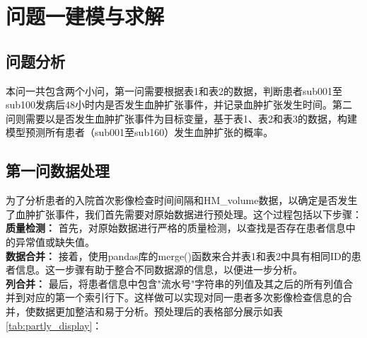 \documentclass[bwprint]{gmcmthesis}
\begin{document}
\clearpage
\section{问题一建模与求解}
\subsection{问题分析}
本问一共包含两个小问，第一问需要根据表1和表2的数据，判断患者sub001至sub100发病后48小时内是否发生血肿扩张事件，并记录血肿扩张发生时间。第二问则需要以是否发生血肿扩张事件为目标变量，基于表1、表2和表3的数据，构建模型预测所有患者（sub001至sub160）发生血肿扩张的概率。

\subsection{第一问数据处理}
为了分析患者的入院首次影像检查时间间隔和HM\_volume数据，以确定是否发生了血肿扩张事件，我们首先需要对原始数据进行预处理。这个过程包括以下步骤：\\
{\bf 质量检测：}
首先，对原始数据进行严格的质量检测，以查找是否存在患者信息中的异常值或缺失值。\\
{\bf 数据合并：}
接着，使用pandas库的merge()函数来合并表1和表2中具有相同ID的患者信息。这一步骤有助于整合不同数据源的信息，以便进一步分析。\\
{\bf 列合并：}
最后，将患者信息中包含"流水号"字符串的列值及其之后的所有列值合并到对应的第一个索引行下。这样做可以实现对同一患者多次影像检查信息的合并，使数据更加整洁和易于分析。预处理后的表格部分展示如表\ref{tab:partly_display}：
\end{document}
